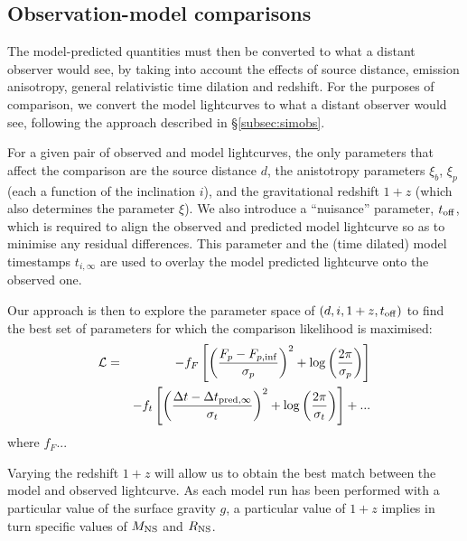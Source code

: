 \documentclass{aastex61}
\begin{document}
\subsection{Observation-model comparisons} 
\label{subsec:lccompare}

The model-predicted quantities must then be converted to what a distant observer would see, by taking into account the effects of source distance, emission anisotropy, general relativistic time dilation and redshift. For the purposes of comparison, we convert the model lightcurves to what a distant observer would see, following the approach described in \S\ref{subsec:simobs}.


For a given pair of observed and model lightcurves, the only parameters that affect the comparison are the source distance $d$, the anistotropy parameters $\xi_b$, $\xi_p$ (each a function of the inclination $i$), and the gravitational redshift $1+z$ (which also determines the parameter $\xi$).
%
We also introduce a ``nuisance'' parameter, $t_{\rm off}$, which is required to align the observed and predicted model lightcurve so as to minimise any residual differences. This parameter and the (time dilated) model timestamps $t_{i,\infty}$ are used to overlay the model predicted lightcurve onto the observed one.

Our approach is then to explore the parameter space of $(d, i, 1+z, t_{\rm off})$ to find the best set of parameters for which the comparison likelihood is maximised:
\begin{eqnarray}
\mathcal{L} & = & -f_F\left[\left( \frac{F_p-F_{p,\rm{inf}}}{\sigma_{p}}\right)^2 
    + \log\left(\frac{2\pi}{\sigma_p}\right)\right] \\
 & & -f_t\left[ \left( \frac{\Delta t-\Delta t_{{\rm pred},\infty}}{\sigma_t}\right)^2
    + \log\left(\frac{2\pi}{\sigma_t}\right)\right] + ...\\
\end{eqnarray}
where $f_F$...

Varying the redshift $1+z$ will allow us to obtain the best match between the model and observed lightcurve.
As each model run has been performed with a particular value of the surface gravity $g$, a particular value of $1+z$ implies in turn specific values of $M_{\rm NS}$ and $R_{\rm NS}$. 
\end{document}
